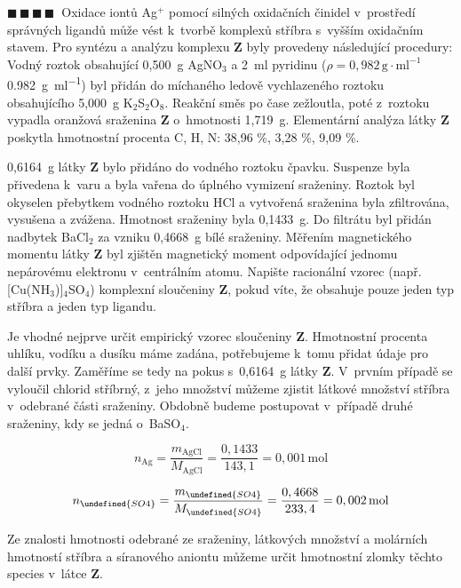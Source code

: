 \documentclass{book}
\let\ch\undefined
\newcommand{\ctyri}{$\blacksquare \, \blacksquare \, \blacksquare \, \blacksquare \; \; $}
\renewenvironment{quotation}{\par}{\par} %
\begin{document}
\hrulefill %
\begin{quotation}
\ctyri Oxidace iontů Ag$^{+}$ pomocí silných oxidačních činidel v~prostředí
správných ligandů může vést k~tvorbě komplexů stříbra s~vyšším oxidačním
stavem. Pro syntézu a analýzu komplexu \textbf{Z} byly provedeny následující
procedury: Vodný roztok obsahující 0,500~g AgNO$_{3}$ a 2~ml pyridinu
($\rho=0,982\,\mathrm{g\cdot ml^{-1}}$\SI[inter-unit-product = \ensuremath{{}\cdot{}},output-decimal-marker = {,}]{0,982}{\gram\per\ml}) byl přidán do míchaného ledově
vychlazeného roztoku obsahujícího 5,000~g K$_{2}$S$_{2}$O$_{8}$.
Reakční směs po čase zežloutla, poté z~roztoku vypadla oranžová sraženina
\textbf{Z} o~hmotnosti 1,719~g. Elementární analýza látky \textbf{Z}
poskytla hmotnostní procenta C, H, N: 38,96 \%, 3,28 \%, 9,09 \%.

0,6164~g látky \textbf{Z} bylo přidáno do vodného roztoku čpavku.
Suspenze byla přivedena k~varu a byla vařena do úplného vymizení sraženiny.
Roztok byl okyselen přebytkem vodného roztoku HCl a vytvořená sraženina
byla zfiltrována, vysušena a zvážena. Hmotnost sraženiny byla 0,1433~g.
Do filtrátu byl přidán nadbytek BaCl$_{2}$ za vzniku 0,4668~g bílé
sraženiny. Měřením magnetického momentu látky \textbf{Z} byl zjištěn
magnetický moment odpovídající jednomu nepárovému elektronu v~centrálním
atomu. Napište racionální vzorec (např. {[}Cu(NH$_{3}$){]}$_{4}$SO$_{4}$)
komplexní sloučeniny \textbf{Z}, pokud víte, že obsahuje pouze jeden
typ stříbra a jeden typ ligandu.
\end{quotation} \dotfill \par 
Je vhodné nejprve určit empirický vzorec sloučeniny \textbf{Z}. Hmotnostní
procenta uhlíku, vodíku a dusíku máme zadána, potřebujeme k~tomu přidat
údaje pro další prvky. Zaměříme se tedy na pokus s~0,6164~g látky
\textbf{Z}. V~prvním případě se vyloučil chlorid stříbrný, z~jeho
množství můžeme zjistit látkové množství stříbra v~odebrané části
sraženiny. Obdobně budeme postupovat v~případě druhé sraženiny, kdy
se jedná o~BaSO$_{4}$.

\[
n_{\mathrm{Ag}}=\frac{m_{\mathrm{AgCl}}}{M_{\mathrm{AgCl}}}=\frac{0,1433}{143,1}=0,001\mathrm{\,mol}
\]

\[
n_{\ch{SO4}}=\frac{m_{\ch{SO4}}}{M_{\ch{SO4}}}=\frac{0,4668}{233,4}=0,002\mathrm{\,mol}
\]

Ze znalosti hmotnosti odebrané ze sraženiny, látkových množství a
molárních hmotností stříbra a síranového aniontu můžeme určit hmotnostní
zlomky těchto species v~látce \textbf{Z}. 
\end{document}
